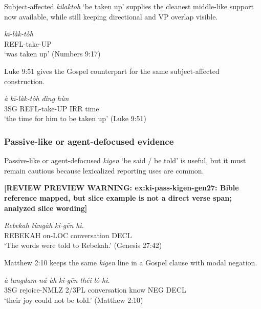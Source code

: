 \documentclass[
  11pt,
  a4paper,
]{article}
\newcommand{\tdim}[1]{\textit{#1}}
\newcommand{\tdimword}[1]{\textit{#1}}
\renewcommand{\textsc}[1]{{\footnotesize\MakeUppercase{#1}}}
\newcommand{\glossquote}[1]{`#1'}
\newcommand{\reviewwarninginline}[1]{\textbf{#1}\par\smallskip}
\begin{document}
Subject-affected \tdim{kilaktoh} \glossquote{be taken up} supplies the
cleanest middle-like support now available, while still keeping
directional and VP overlap visible.

\begin{exe}
\ex \label{ex:ki-mid-kilaktoh-num9}
\gll \tdimword{kī-làk-tòh} \\
     \textsc{refl}-take-\textsc{up} \\
\glt \glossquote{was taken up} (Numbers 9:17)
\end{exe}

Luke 9:51 gives the Gospel counterpart for the same subject-affected
construction.

\begin{exe}
\ex \label{ex:ki-mid-kilaktoh-luke9}
\gll \tdimword{à} \tdimword{kī-làk-tòh} \tdimword{dìng} \tdimword{hùn} \\
     \textsc{3sg} \textsc{refl}-take-\textsc{up} \textsc{irr} time \\
\glt \glossquote{the time for him to be taken up} (Luke 9:51)
\end{exe}

\subsubsection{Passive-like or agent-defocused
evidence}\label{passive-like-or-agent-defocused-evidence}

Passive-like or agent-defocused \tdim{kigen}
\glossquote{be said / be told} is useful, but it must remain cautious
because lexicalized reporting uses are common.

\begin{exe}
\ex \label{ex:ki-pass-kigen-gen27}
\reviewwarninginline{[REVIEW PREVIEW WARNING: ex:ki-pass-kigen-gen27: Bible reference mapped, but slice example is not a direct verse span; analyzed slice wording]}
\gll \tdimword{Rebekah} \tdimword{tùngàh} \tdimword{ki-gēn} \tdimword{hì.} \\
     \textsc{rebekah} on-\textsc{loc} conversation \textsc{decl} \\
\glt \glossquote{The words were told to Rebekah.} (Genesis 27:42)
\end{exe}

Matthew 2:10 keeps the same \tdim{kigen} line in a Gospel clause with
modal negation.

\begin{exe}
\ex \label{ex:ki-pass-kigen-matt2}
\gll \tdimword{à} \tdimword{lungdam-ná} \tdimword{ùh} \tdimword{ki-gēn} \tdimword{théi} \tdimword{lò} \tdimword{hì.} \\
     \textsc{3sg} rejoice-\textsc{nmlz} 2/3PL conversation know \textsc{neg} \textsc{decl} \\
\glt \glossquote{their joy could not be told.} (Matthew 2:10)
\end{exe}
\end{document}
